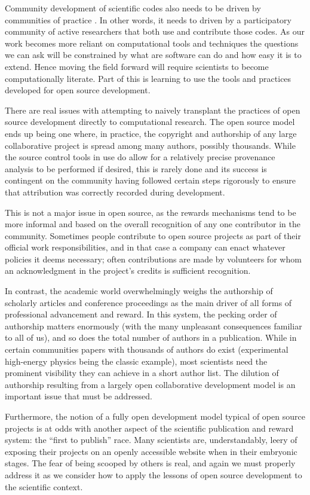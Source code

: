 \documentclass[ChapterTOCs,krantz2]{krantz} %
\begin{document}
Community development of scientific codes also needs to be driven by
communities of practice \cite{turk2013scale}. In other words, it
needs to driven by a participatory community of active researchers
that both use and contribute those codes. As our work becomes more
reliant on computational tools and techniques the questions we can
ask will be constrained by what are software can do and how easy it
is to extend. Hence moving the field forward will require scientists
to become computationally literate. Part of this is learning to use
the tools and practices developed for open source development.

There are real issues with attempting to naively transplant the practices of
open source development directly to computational research. The open source
model ends up being one where, in practice, the copyright and authorship of any
large collaborative project is spread among many authors, possibly thousands.
While the source control tools in use do allow for a relatively precise
provenance analysis to be performed if desired, this is rarely done and its
success is contingent on the community having followed certain steps rigorously
to ensure that attribution was correctly recorded during development.

This is not a major issue in open source, as the rewards mechanisms tend to be
more informal and based on the overall recognition of any one contributor in
the community. Sometimes people contribute to open source projects as part of
their official work responsibilities, and in that case a company can enact
whatever policies it deems necessary; often contributions are made by
volunteers for whom an acknowledgment in the project's credits is sufficient
recognition.

In contrast, the academic world overwhelmingly weighs the authorship of
scholarly articles and conference proceedings as the main driver of all forms
of professional advancement and reward. In this system, the pecking order of
authorship matters enormously (with the many unpleasant consequences familiar
to all of us), and so does the total number of authors in a publication. While
in certain communities papers with thousands of authors do exist (experimental
high-energy physics being the classic example), most scientists need the
prominent visibility they can achieve in a short author list. The dilution of
authorship resulting from a largely open collaborative development model is an
important issue that must be addressed.

Furthermore, the notion of a fully open development model typical of open
source projects is at odds with another aspect of the scientific publication
and reward system: the ``first to publish'' race. Many scientists are,
understandably, leery of exposing their projects on an openly accessible
website when in their embryonic stages. The fear of being scooped by others is
real, and again we must properly address it as we consider how to apply the
lessons of open source development to the scientific context.
\end{document}
